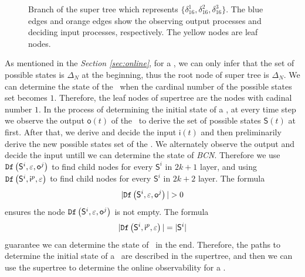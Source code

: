   \begin{figure}[thpb]
      \centering
      
      \caption{Branch of the super tree which represents $\{\delta_{16}^1,\delta_{16}^2,\delta_{16}^3\}$. The blue edges and orange edges show the observing output processes and deciding input processes, respectively. The yellow nodes are leaf nodes.}
      \label{fig:3}
   \end{figure}

As mentioned in the {\em Section \ref{sec:online}}, for a \BCN, we can only infer that the set of possible states is $\Delta_N$ at the beginning, thus the root node of super tree is $\Delta_N$. We can determine the state of the \BCN\ when the cardinal number of the possible states set becomes $1$. Therefore, the leaf nodes of supertree are the nodes with cadinal number $1$. In the process of determining the initial state of a \BCN, at every time step we observe the output $\mathsf{o}(t)$ of the \BCN\ to derive the set of possible states $\mathsf{S}(t)$ at first. After that, we derive and decide the input $\mathsf{i}(t)$ and then preliminarily derive the new possible states set of the \BCN. We alternately observe the output and decide the input untill we can determine the state of {\em BCN}. Therefore we use ${\tt Df}\left(\mathsf{S}^i,\varepsilon, \mathsf{o}^j\right)$ to find child nodes for every $\mathsf{S}^i$ in $2k+1$ layer, and using ${\tt Df}\left(\mathsf{S}^i,\mathsf{i}^p,\varepsilon\right)$ to find child nodes for every $\mathsf{S}^i$ in $2k+2$ layer. The formula 
\[|\Ded\left(\mathsf{S}^i,\varepsilon, \mathsf{o}^j\right)|>0\]
 ensures the node ${\tt Df}\left(\mathsf{S}^i,\varepsilon, \mathsf{o}^j\right)$ is not empty. The formula 
 \[|{\tt Df}\left(\mathsf{S}^i,\mathsf{i}^p,\varepsilon\right)|=|\mathsf{S}^i|\] 
 guarantee we can determine the state of \BCN\ in the end. Therefore, the paths to determine the initial state of a \BCN\ are described in the supertree, and then we can use the supertree to determine the online observability for a \BCN.

